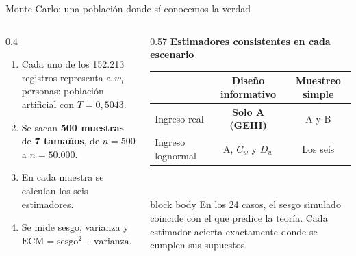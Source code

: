 \documentclass[aspectratio=169,11pt]{beamer}
\newenvironment{caja}{\begin{beamercolorbox}[sep=5pt]{block body}}{\end{beamercolorbox}}
\begin{document}
\begin{frame}{Monte Carlo: una población donde sí conocemos la verdad}
  \begin{columns}[T]
    \begin{column}{0.4\textwidth}
      \small
      \begin{enumerate}
        \item Cada uno de los 152.213 registros representa a $w_i$ personas: población artificial con $T=0{,}5043$.
        \item Se sacan \textbf{500 muestras} de \textbf{7 tamaños}, de $n=500$ a $n=50{.}000$.
        \item En cada muestra se calculan los seis estimadores.
        \item Se mide sesgo, varianza y\\ $\mathrm{ECM}=\text{sesgo}^2+\text{varianza}$.
      \end{enumerate}
    \end{column}
    \begin{column}{0.57\textwidth}
      \centering
      {\small\textbf{Estimadores consistentes en cada escenario}}\\[0.2cm]
      \footnotesize
      \renewcommand{\arraystretch}{1.5}
      \begin{tabular}{@{}lcc@{}}
        \toprule
        & Diseño informativo & Muestreo simple \\
        \midrule
        Ingreso real & \textbf{\color{rojo}Solo A (GEIH)} & A y B \\
        Ingreso lognormal & A, $C_w$ y $D_w$ & Los seis \\
        \bottomrule
      \end{tabular}\\[0.35cm]
      \begin{caja}
        \footnotesize En los 24 casos, el sesgo simulado coincide con el que predice la teoría. Cada estimador acierta exactamente donde se cumplen sus supuestos.
      \end{caja}
    \end{column}
  \end{columns}
\end{frame}
\end{document}
